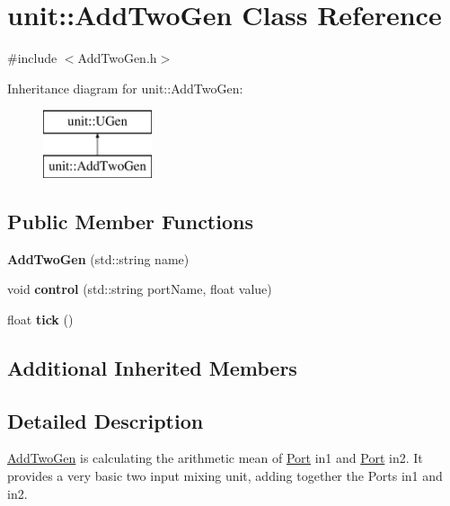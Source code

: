 \hypertarget{classunit_1_1AddTwoGen}{\section{unit\-:\-:Add\-Two\-Gen Class Reference}
\label{classunit_1_1AddTwoGen}
}


{\ttfamily \#include $<$Add\-Two\-Gen.\-h$>$}

Inheritance diagram for unit\-:\-:Add\-Two\-Gen\-:\begin{figure}[H]
\begin{center}
\leavevmode
\includegraphics[height=2.000000cm]{classunit_1_1AddTwoGen}
\end{center}
\end{figure}
\subsection*{Public Member Functions}
\begin{DoxyCompactItemize}
\item 
\hypertarget{classunit_1_1AddTwoGen_a6feb4da948f12b37eb4502899b5a4311}{{\bfseries Add\-Two\-Gen} (std\-::string name)}\label{classunit_1_1AddTwoGen_a6feb4da948f12b37eb4502899b5a4311}

\item 
\hypertarget{classunit_1_1AddTwoGen_a5e0a82722566595b7284386a618ef3cb}{void {\bfseries control} (std\-::string port\-Name, float value)}\label{classunit_1_1AddTwoGen_a5e0a82722566595b7284386a618ef3cb}

\item 
\hypertarget{classunit_1_1AddTwoGen_a8e667f4f6c6849faef9f07a62e779d9a}{float {\bfseries tick} ()}\label{classunit_1_1AddTwoGen_a8e667f4f6c6849faef9f07a62e779d9a}

\end{DoxyCompactItemize}
\subsection*{Additional Inherited Members}


\subsection{Detailed Description}
\hyperlink{classunit_1_1AddTwoGen}{Add\-Two\-Gen} is calculating the arithmetic mean of \hyperlink{classPort}{Port} in1 and \hyperlink{classPort}{Port} in2. It provides a very basic two input mixing unit, adding together the Ports in1 and in2.

